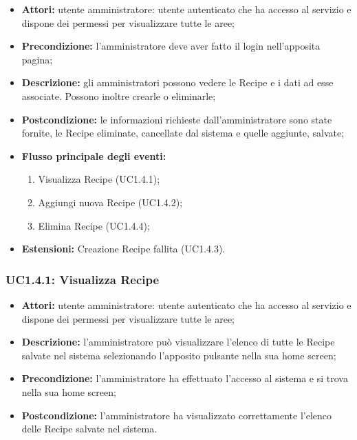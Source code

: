 \begin{itemize}
    \item \textbf{Attori:} utente amministratore: utente autenticato che ha accesso al servizio e dispone dei permessi per visualizzare tutte le aree;
    \item \textbf{Precondizione:} l'amministratore deve aver fatto il login nell'apposita pagina;
    \item \textbf{Descrizione:} gli amministratori possono vedere le Recipe\gloss{} e i dati ad esse associate. Possono inoltre crearle o eliminarle;
    \item \textbf{Postcondizione:} le informazioni richieste dall'amministratore sono state fornite, le Recipe\gloss{} eliminate, cancellate dal sistema e quelle aggiunte, salvate;
    \item \textbf{Flusso principale degli eventi:}
    \begin{enumerate}
        \item Visualizza Recipe\gloss{} (UC1.4.1);
        \item Aggiungi nuova Recipe\gloss{} (UC1.4.2);
        \item Elimina Recipe\gloss{} (UC1.4.4);
    \end{enumerate}
    \item \textbf{Estensioni:} Creazione Recipe\gloss{} fallita (UC1.4.3).
\end{itemize}

\subsubsection{UC1.4.1: Visualizza Recipe}

\begin{itemize}
    \item \textbf{Attori:} utente amministratore: utente autenticato che ha accesso al servizio e dispone dei permessi per visualizzare tutte le aree;
    \item \textbf{Descrizione:} l'amministratore può visualizzare l'elenco di tutte le Recipe\gloss{} salvate nel sistema selezionando l'apposito pulsante nella sua home screen;
    \item \textbf{Precondizione:} l'amministratore ha effettuato l'accesso al sistema e si trova nella sua home screen;
    \item \textbf{Postcondizione:} l'amministratore ha visualizzato correttamente l'elenco delle Recipe\gloss{} salvate nel sistema.
\end{itemize}


